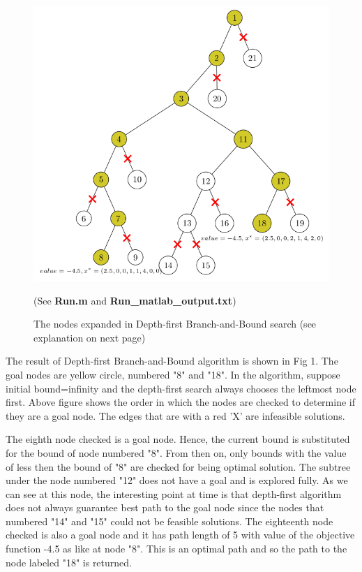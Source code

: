 \documentclass{article}
\begin{document}
\begin{itemize}
\begin{figure}[htp!]
\includegraphics[scale=.5]{prob1d_matlab_depthfirst}
\caption{The nodes expanded in Depth-first Branch-and-Bound search (see explanation on next page)}
\vspace{.5in}
\begin{center}
(See \textbf{Run.m} and \textbf{Run\_matlab\_output.txt})
\end{center}
\end{figure}

\newpage

The result of Depth-first Branch-and-Bound algorithm is shown in Fig 1. The goal nodes are yellow circle, numbered "8" and "18". In the algorithm, suppose initial bound=infinity and the depth-first search always chooses the leftmost node first. Above figure shows the order in which the nodes are checked to determine if they are a goal node. The edges that are with a red 'X'  are infeasible solutions. 

The eighth node checked is a goal node. Hence, the current bound is substituted for the bound of node numbered  "8". From then on, only bounds with the value of less then the bound of "8" are checked for being optimal solution. 
The subtree under the node numbered "12" does not have a goal and is explored fully. As we can see at this node, the interesting point at time is that depth-first algorithm does not always guarantee best path to the goal node since the nodes that numbered "14" and "15" could not be feasible solutions. 
The eighteenth node checked is also a goal node and it has path length of 5 with value of the objective function -4.5 as like at node "8". This is an optimal path and so the path to the node labeled "18" is returned.


\end{itemize}
\end{document}
